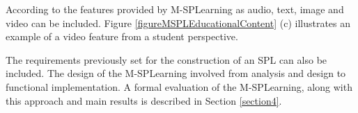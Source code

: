 According to the features provided by M-SPLear\allowbreak ning as audio, text, image and video can be included. %
Figure \ref{figureMSPLEducationalContent} (c) illustrates an example of a video feature from a student perspective.

The requirements previously set for the construction of an SPL can also be included. The design of the M-SPLear\allowbreak ning involved from analysis and design to functional implementation. A formal evaluation of the M-SPLear\allowbreak ning, along with this approach and main results is described in Section \ref{section4}.
